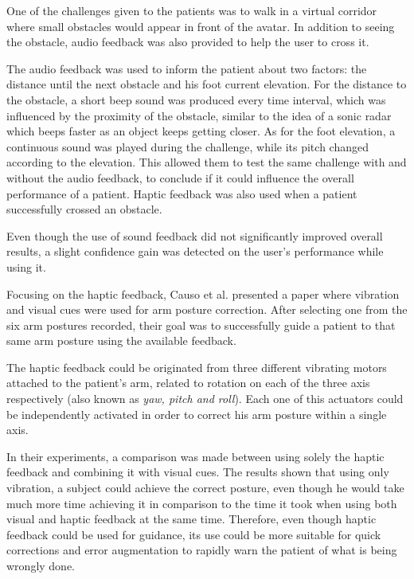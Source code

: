 \documentclass[runningheads]{llncs}
\begin{document}
One of the challenges given to the patients was to walk in a virtual corridor where small obstacles would appear in front of the avatar. 
In addition to seeing the obstacle, audio feedback was also provided to help the user to cross it.

The audio feedback was used to inform the patient about two factors: the distance until 
the next obstacle and his foot current elevation. 
For the distance to the obstacle, a short beep sound was produced every time interval, which was influenced by 
the proximity of the obstacle, similar to the idea of a sonic radar which beeps faster as an object keeps getting closer. 
As for the foot elevation, a continuous 
sound was played during the challenge, while its pitch changed according to the elevation. 
This allowed them to test the same challenge with and without the audio feedback, to conclude if it could 
influence the overall performance of a patient. Haptic feedback was also used when a patient successfully crossed an obstacle.

Even though the use of sound feedback did not significantly improved overall results, a
slight confidence gain was detected on the user's performance while using it.

Focusing on the haptic feedback, Causo et al.\cite{Causo2011} presented a 
paper where vibration and visual cues were used for arm posture correction.
After selecting one from the six arm postures recorded, their goal 
was to successfully guide a patient to that same arm posture using the available feedback.

The haptic feedback could be originated from three different 
vibrating motors attached to the patient's arm, related to 
rotation on each of the three axis respectively (also known 
as \textit{yaw, pitch and roll}). Each one of this actuators 
could be independently activated in order to correct his arm 
posture within a single axis.

In their experiments, a comparison was made between using solely 
the haptic feedback and combining it with visual cues. 
The results shown that using only vibration, a subject 
could achieve the correct posture, even though he would 
take much more time achieving it in comparison to the time 
it took when using both visual and haptic feedback at the same time.
Therefore, even though haptic feedback could be used for guidance, its use 
could be more suitable for quick corrections and error augmentation to rapidly 
warn the patient of what is being wrongly done. 
\end{document}
